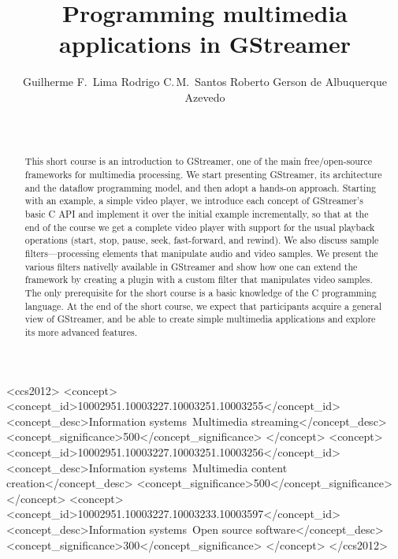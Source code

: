 \documentclass{sig-alternate-05-2015}
\begin{document}
%
%
%
%
%
%
%
\title{Programming multimedia applications in GStreamer}
\author{%
\alignauthor
Guilherme F.~Lima\quad
Rodrigo C.\,M.~Santos\quad
Roberto Gerson de Albuquerque Azevedo\\
\\
\\
}
\maketitle
\begin{abstract}
  This short course is an introduction to GStreamer, one of the main
  free/open-source frameworks for multimedia processing.  We start
  presenting GStreamer, its architecture and the dataflow programming model,
  and then adopt a hands-on approach.  Starting with an example, a simple
  video player, we introduce each concept of GStreamer’s basic C API and
  implement it over the initial example incrementally, so that at the end of
  the course we get a complete video player with support for the usual
  playback operations (start, stop, pause, seek, fast-forward, and rewind).
  We also discuss sample filters---processing elements that manipulate audio
  and video samples.  We present the various filters nativelly available in
  GStreamer and show how one can extend the framework by creating a plugin
  with a custom filter that manipulates video samples.  The only
  prerequisite for the short course is a basic knowledge of the C
  programming language.  At the end of the short course, we expect that
  participants acquire a general view of GStreamer, and be able to create
  simple multimedia applications and explore its more advanced features.
\end{abstract}

 \begin{CCSXML}
<ccs2012>
<concept>
<concept_id>10002951.10003227.10003251.10003255</concept_id>
<concept_desc>Information systems~Multimedia streaming</concept_desc>
<concept_significance>500</concept_significance>
</concept>
<concept>
<concept_id>10002951.10003227.10003251.10003256</concept_id>
<concept_desc>Information systems~Multimedia content creation</concept_desc>
<concept_significance>500</concept_significance>
</concept>
<concept>
<concept_id>10002951.10003227.10003233.10003597</concept_id>
<concept_desc>Information systems~Open source software</concept_desc>
<concept_significance>300</concept_significance>
</concept>
</ccs2012>
\end{CCSXML}
\end{document}
